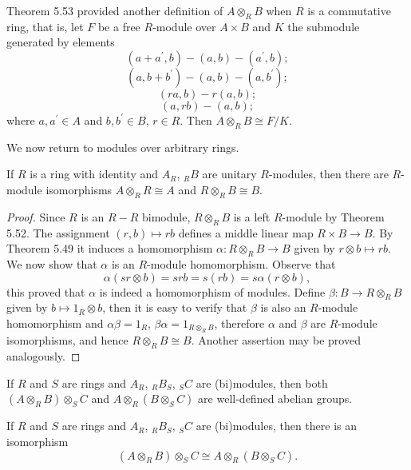 Theorem 5.53 provided another definition of $A\otimes_RB$ when $R$ is a commutative ring, that is, let $F$ be a free $R$-module over $A\times B$ and $K$ the submodule generated by elements 
$$
\left( a+a^{\prime},b \right) -\left( a,b \right) -\left( a^{\prime},b \right) ;
$$
$$
\left( a,b+b^{\prime} \right) -\left( a,b \right) -\left( a,b^{\prime} \right) ;
$$
$$
\left( ra,b \right) -r\left( a,b \right) ;
$$
$$
\left( a,rb \right) -\left( a,b \right) ;
$$
where $a,a^\prime\in A$ and $b,b^\prime\in B$, $r\in R$. Then $A\otimes_RB\cong F/K$.\par
We now return to modules over arbitrary rings.
\begin{theorem}
If $R$ is a ring with identity and $A_R$, $_RB$ are unitary $R$-modules, then there are $R$-module isomorphisms $A\otimes_RR\cong A$ and $R\otimes_RB\cong B$.
\end{theorem}
\begin{proof}
Since $R$ is an $R-R$ bimodule, $R\otimes_RB$ is a left $R$-module by Theorem 5.52. The assignment $(r,b)\mapsto rb$ defines a middle linear map $R\times B\to B$. By Theorem 5.49 it induces a homomorphism $\alpha:R\otimes_RB\to B$ given by $r\otimes b\mapsto rb$. We now show that $\alpha$ is an $R$-module homomorphism. Observe that 
$$
\alpha \left( sr\otimes b \right) =srb=s\left( rb \right) =s\alpha \left( r\otimes b \right) ,
$$
this proved that $\alpha$ is indeed a homomorphism of modules. Define $\beta:B\to R\otimes_RB$ given by $b\mapsto 1_R\otimes b$, then it is easy to verify that $\beta$ is also an $R$-module homomorphism and $\alpha\beta=1_R$, $\beta\alpha=1_{R\otimes_RB}$, therefore $\alpha$ and $\beta$ are $R$-module isomorphisms, and hence $R\otimes_RB\cong B$. Another assertion may be proved analogously.
\end{proof}
If $R$ and $S$ are rings and $A_R$, $_RB_S$, $_SC$ are (bi)modules, then both $(A\otimes_RB)\otimes_SC$ and $A\otimes_R(B\otimes_SC)$ are well-defined abelian groups.
\begin{theorem}
If $R$ and $S$ are rings and $A_R$, $_RB_S$, $_SC$ are (bi)modules, then there is an isomorphism 
$$
\left( A\otimes _RB \right) \otimes _SC\cong A\otimes _R\left( B\otimes _SC \right) .
$$
\end{theorem}
